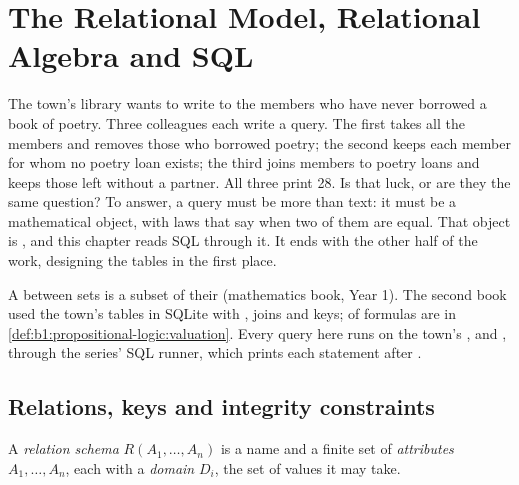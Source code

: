 \chapter{The Relational Model, Relational Algebra and SQL}\label{ch:b1:relational-model}

The town's library wants to write to the members who have never borrowed a book of poetry. Three colleagues each write
a query. The first takes all the members and removes those who borrowed poetry; the second keeps each member for whom
no poetry loan exists; the third joins members to poetry loans and keeps those left without a partner. All three print
28. Is that luck, or are they the same question? To answer, a query must be more than text: it must be a mathematical
object, with laws that say when two of them are equal. That object is , and this chapter reads SQL
through it. It ends with the other half of the work, designing the tables in the first place.

\begin{recall}
A  between sets is a subset of their  (mathematics book, Year 1). The second book used the
town's tables in SQLite with , joins and keys;  of formulas are in
\cref{def:b1:propositional-logic:valuation}. Every query here runs on the town's ,  and
, through the series' SQL runner, which prints each statement after .
\end{recall}

\section{Relations, keys and integrity constraints}\label{sec:b1:relational-model:relations}

\begin{definition}\label{def:b1:relational-model:schema}
A \emph{relation schema} $R(A_1, \dots, A_n)$ is a name and a finite set of
\emph{attributes} $A_1, \dots, A_n$, each with a \emph{domain} $D_i$, the set of values it may take.
\end{definition}

